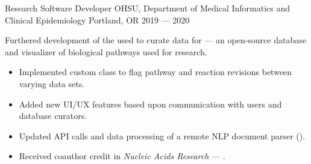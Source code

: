 \showoff
{Research Software Developer}
{OHSU, Department of Medical Informatics and Clinical Epidemiology}
{Portland, OR}
{2019 --- 2020}

Furthered development of the  used to curate data for  --- an open-source database and visualizer of biological pathways used for research.

\begin{itemize}[label=$\triangleright$]
    \item Implemented custom class to flag pathway and reaction revisions between varying data sets.
    \item Added new UI/UX features based upon communication with users and database curators.
    \item Updated API calls and data processing of a remote NLP document parser ().
    \item Received coauthor credit in \emph{Nucleic Acids Research} --- .
\end{itemize}

